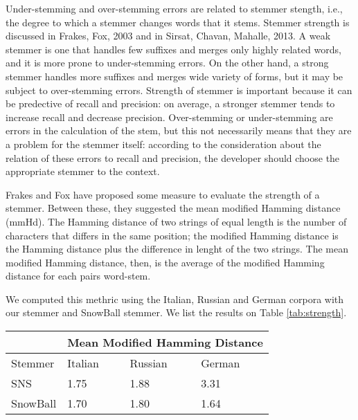 Under-stemming and over-stemming errors are related to stemmer stength, i.e., the degree to which a stemmer changes words that it stems. Stemmer strength is discussed in Frakes, Fox, 2003\cite{frakes} and in Sirsat, Chavan, Mahalle, 2013\cite{sirsat}.
A weak stemmer is one that handles few suffixes and merges only highly related words, and it is more prone to under-stemming errors.
On the other hand, a strong stemmer handles more suffixes and merges wide variety of forms, but it may be subject to over-stemming errors. Strength of stemmer is important because it can be predective of recall and precision: on average, a stronger stemmer tends to increase recall and decrease precision.
Over-stemming or under-stemming are errors in the calculation of the stem, but this not necessarily means that they are a problem for the stemmer itself: according to the consideration about the relation of these errors to recall and precision, the developer should choose the appropriate stemmer to the context. 

Frakes and Fox have proposed some measure to evaluate the strength of a stemmer. Between these, they suggested the mean modified Hamming distance (mmHd). The Hamming distance of two strings of equal length is the number of characters that differs in the same position; the modified Hamming distance is the Hamming distance plus the difference in lenght of the two strings. The mean modified Hamming distance, then, is the average of the modified Hamming distance for each pairs word-stem.

We computed this methric using the Italian, Russian and German corpora with our stemmer and SnowBall stemmer. We list the results on Table \ref{tab:strength}.

\begin{center}
   \begin{tabular}{| l | l | l | l |}
    \hline
    & \multicolumn{3}{l|}{\textbf{Mean Modified Hamming Distance}}\\ \hline
    Stemmer & Italian & Russian & German\\ \hline
    SNS & 1.75 & 1.88 & 3.31 \\ \hline
    SnowBall & 1.70 & 1.80 & 1.64\\ \hline    
    \end{tabular}
    \label{tab:strength}
\end{center}

